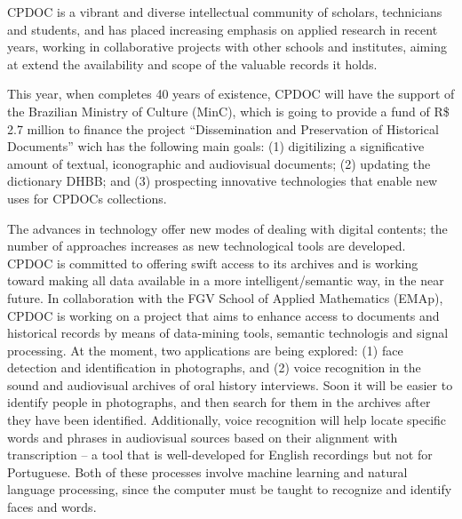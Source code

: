 
CPDOC is a vibrant and diverse intellectual community of scholars,
technicians and students, and has placed increasing emphasis on
applied research in recent years, working in collaborative projects
with other schools and institutes, aiming at extend the availability
and scope of the valuable records it holds. 


This year, when completes 40 years of existence, CPDOC will have the
support of the Brazilian Ministry of Culture (MinC), which is going to
provide a fund of R\$ 2.7 million to finance the project
``Dissemination and Preservation of Historical Documents'' wich has
the following main goals: (1) digitilizing a significative amount of
textual, iconographic and audiovisual documents; (2) updating the
dictionary DHBB; and (3) prospecting innovative technologies that
enable new uses for CPDOCs collections.

The advances in technology offer new modes of dealing with digital
contents; the number of approaches increases as new technological
tools are developed.  CPDOC is committed to offering swift access to
its archives and is working toward making all data available in a more
intelligent/semantic way, in the near future. In collaboration with
the FGV School of Applied Mathematics (EMAp), CPDOC is working on a
project that aims to enhance access to documents and historical
records by means of data-mining tools, semantic technologis and signal
processing. At the moment, two applications are being explored: (1)
face detection and identification in photographs, and (2) voice
recognition in the sound and audiovisual archives of oral history
interviews. Soon it will be easier to identify people in photographs,
and then search for them in the archives after they have been
identified. Additionally, voice recognition will help locate specific
words and phrases in audiovisual sources based on their alignment with
transcription -- a tool that is well-developed for English recordings
but not for Portuguese. Both of these processes involve machine
learning and natural language processing, since the computer must be
taught to recognize and identify faces and words.

